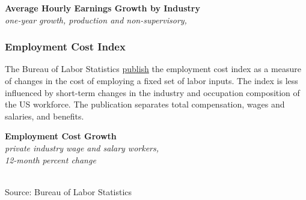 \documentclass{report}
\makeatletter
\newcommand{\tbllink}[1]{\href{https://raw.githubusercontent.com/bdecon/US-chartbook/master/chartbook/data/#1}{\faTable}}
\newcommand*\short[1]{\expandafter\@gobbletwo\number\numexpr#1\relax}
\newcommand{\stdnode}[3]{\node[below, align=left, shift=({#1,#2})]{#3};}
\newcommand{\dateaxisticks}{
		date coordinates in=x, axis line style={draw=none},
		xmax={2021-06-15},
		max space between ticks=40,	    
		xtick={{1990-01-01}, {1992-01-01}, {1994-01-01}, 
			{1996-01-01}, {1998-01-01}, {2000-01-01}, 
			{2002-01-01}, {2004-01-01}, {2006-01-01},
			{2008-01-01}, {2010-01-01}, {2012-01-01}, {2014-01-01},
		    {2016-01-01}, {2018-01-01}, {2020-01-01}},
		minor xtick={{1989-01-01}, {1991-01-01}, {1993-01-01},
			{1995-01-01}, {1997-01-01}, {1999-01-01}, 
			{2001-01-01}, {2003-01-01}, {2005-01-01}, {2007-01-01},
		    {2009-01-01}, {2011-01-01}, {2013-01-01}, {2015-01-01},
		    {2017-01-01}, {2019-01-01}, {2021-01-01}},
		enlarge y limits={0.06}, enlarge x limits={0.01},
		}
\newcommand{\bbar}[2]{extra #1 ticks = {{#2}}, extra #1 tick labels = ,
		extra #1 tick style = {grid=major, grid style={thick, black!25}},}
\newcommand{\stdline}[4]{\addplot[very thick, no markers, color=#1] 
		table [x=#2, y=#3, col sep=comma] {#4};	}
\newcommand{\rebars}{
		\fill[color=black!10] (axis cs:{2007-12-01},\pgfkeysvalueof{/pgfplots/ymin}) rectangle 
			(axis cs:{2009-07-01}, \pgfkeysvalueof{/pgfplots/ymax});
		\fill[color=black!10] (axis cs:{2001-03-01},\pgfkeysvalueof{/pgfplots/ymin}) rectangle 
			(axis cs:{2001-11-01}, \pgfkeysvalueof{/pgfplots/ymax});
		\fill[color=black!10] (axis cs:{2020-02-01},\pgfkeysvalueof{/pgfplots/ymin}) rectangle 
			(axis cs:{2021-06-15}, \pgfkeysvalueof{/pgfplots/ymax});}
\makeatother
\begin{document}
{{\begin{minipage}{0.76\textwidth}
\small  
\vspace{3mm}

\normalsize \textbf{Average Hourly Earnings Growth by Industry}\\
\footnotesize{\textit{one-year growth, production and non-supervisory, }}\\

\end{minipage}
\newpage
\begin{minipage}{0.76\textwidth}
\subsubsection*{\color{black!70} \seriffont Employment Cost Index}
\small The Bureau of Labor Statistics \href{https://www.bls.gov/news.release/eci.nr0.htm}{publish} the employment cost index as a measure of changes in the cost of employing a fixed set of labor inputs. The index is less influenced by short-term changes in the industry and occupation composition of the US workforce. The publication separates total compensation, wages and salaries, and benefits.
\end{minipage}

\begin{minipage}{0.44\textwidth}
\normalsize \textbf{Employment Cost Growth}\\
\footnotesize{\textit{private industry wage and salary workers,}}\\
\footnotesize{\textit{12-month percent change}}\\
\hspace*{-2mm} \\
\footnotesize{Source: Bureau of Labor Statistics} \hfill \tbllink{eci.csv}
\end{minipage} \hspace{6mm} \begin{minipage}{0.27\textwidth}
\small 
\end{minipage}
\newpage
}}
\end{document}
